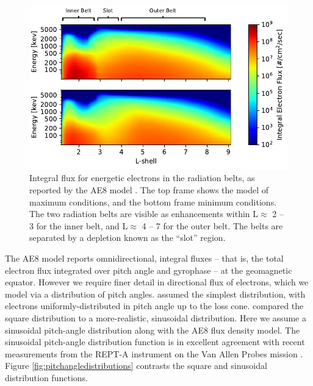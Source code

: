 \begin{figure}
\begin{center}
\includegraphics{figures/AE8_fluxes.pdf}
\caption[AE8 integral flux model]{Integral flux for energetic electrons in the radiation belts, as reported by the AE8 model \citep{Vette1991}. The top frame shows the model of maximum conditions, and the bottom frame minimum conditions. The two radiation belts are visible as enhancements within L$\approx$ 2 -- 3 for the inner belt, and L$\approx$ 4 -- 7 for the outer belt. The belts are separated by a depletion known as the ``slot'' region.}
\label{fig:AE8_model}
\end{center}
\end{figure}

The AE8 model reports omnidirectional, integral fluxes -- that is, the total electron flux integrated over pitch angle and gyrophase -- at the geomagnetic equator. However we require finer detail in directional flux of electrons, which we model via a distribution of pitch angles. \cite{Lauben1998} assumed the simplest distribution, with electrons uniformly-distributed in pitch angle up to the loss cone. \cite{Bortnik2005} compared the square distribution to a more-realistic, sinusoidal distribution. Here we assume a sinusoidal pitch-angle distribution along with the AE8 flux density model. The sinusoidal pitch-angle distribution function is in excellent agreement with recent measurements from the REPT-A instrument on the Van Allen Probes mission \citep{Baker2014}. Figure \ref{fig:pitchangledistributions} contrasts the square and sinusoidal distribution functions.


